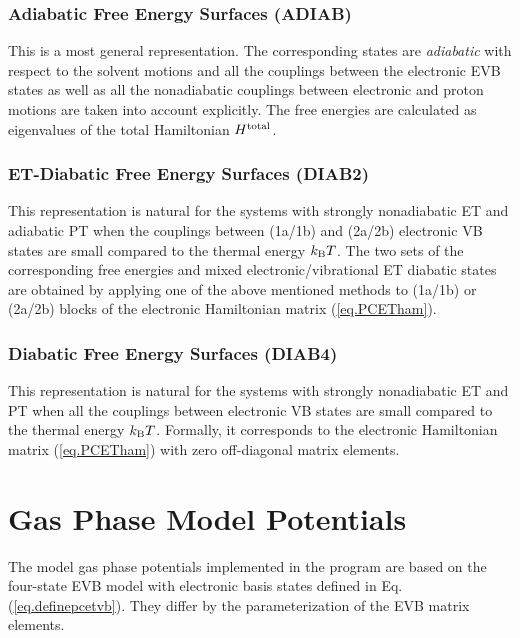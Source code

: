 \documentclass[oneside,11pt,openany]{book}
\newcommand{\tw}{\ttfamily}
\begin{document}
\subsubsection{Adiabatic Free Energy Surfaces ({\tw ADIAB})}
This is a most general representation. The corresponding states
are {\em adiabatic} with respect to the solvent motions and
all the couplings between the electronic EVB states as well
as all the nonadiabatic couplings between electronic and
proton motions are taken into account explicitly. The free
energies are calculated as eigenvalues of the total Hamiltonian
$H^{\rm total}$.

\subsubsection{ET-Diabatic Free Energy Surfaces ({\tw DIAB2})}
This representation is natural for the systems with strongly
nonadiabatic ET and adiabatic PT when the couplings between (1a/1b)
and (2a/2b) electronic VB states are small compared to the thermal energy
$k_{\rm B}T$. The two sets of the corresponding free energies
and mixed electronic/vibrational ET diabatic states are obtained
by applying one of the above mentioned methods to (1a/1b) or
(2a/2b) blocks of the electronic Hamiltonian matrix (\ref{eq.PCETham}).

\subsubsection{Diabatic Free Energy Surfaces ({\tw DIAB4})}
This representation is natural for the systems with strongly
nonadiabatic ET and PT when all the couplings between electronic
VB states are small compared to the thermal energy $k_{\rm B}T$.
Formally, it corresponds to the electronic Hamiltonian matrix
(\ref{eq.PCETham}) with zero off-diagonal matrix elements.

\section{Gas Phase Model Potentials}
The model gas phase potentials implemented in the program are
based on the four-state EVB model with electronic basis states
defined in Eq.(\ref{eq.definepcetvb}). They differ by the
parameterization of the EVB matrix elements.
\end{document}

